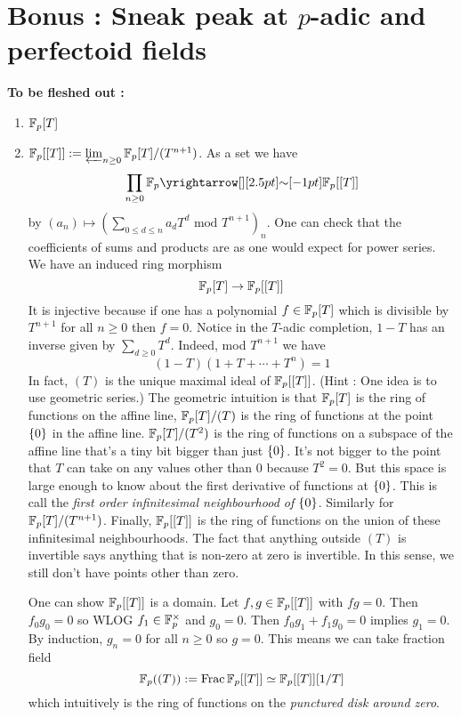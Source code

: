 \documentclass{article}
\begin{document}
\section{Bonus : Sneak peak at $p$-adic and perfectoid fields}

\textbf{To be fleshed out : }
\begin{enumerate}
  \item $\mathbb{F}_p[T]$
  \item $\mathbb{F}_p[[T]] := \varprojlim_{n \geq 0} \mathbb{F}_p[T] / (T^{n+1})$.
  As a set we have \[
    \prod_{n \geq 0} \bF_p \map{\sim}{} \bF_p[[T]]
  \]
  by $(a_n) \mapsto (\sum_{0 \leq d \leq n} a_d T^d \text{ mod } T^{n+1})_n$.
  One can check that the coefficients of
  sums and products are as one would expect for power series.
  We have an induced ring morphism \[
    \mathbb{F}_p[T] \to \mathbb{F}_p[[T]]
  \]
  It is injective because if one has a polynomial $f \in \mathbb{F}_p[T]$
  which is divisible by $T^{n+1}$ for all $n \geq 0$ then $f = 0$.
  Notice in the $T$-adic completion,
  $1 - T$ has an inverse given by $\sum_{d \geq 0} T^d$.
  Indeed, mod $T^{n+1}$ we have \[
    (1 - T)(1 + T + \cdots + T^{n}) = 1
  \]
  In fact, $(T)$ is the unique maximal ideal of $\mathbb{F}_p[[T]]$.
  (Hint : One idea is to use geometric series.)
  The geometric intuition is that 
  $\mathbb{F}_p[T]$ is the ring of functions on the affine line,
  $\mathbb{F}_p[T] / (T)$ is the ring of functions 
  at the point $\left\{0\right\}$ in the affine line.
  $\mathbb{F}_p[T] / (T^2)$ is the ring of functions on 
  a subspace of the affine line that's a tiny bit bigger than just $\left\{0\right\}$.
  It's not bigger to the point that $T$ can take on any values
  other than $0$ because $T^2 = 0$.
  But this space is large enough to know about
  the first derivative of functions at $\left\{0\right\}$.
  This is call the \emph{first order infinitesimal neighbourhood of $\left\{0\right\}$}.
  Similarly for $\mathbb{F}_p[T] / (T^{n+1})$.
  Finally, $\mathbb{F}_p[[T]]$ is the ring of functions
  on the union of these infinitesimal neighbourhoods.
  The fact that anything outside $(T)$ is invertible
  says anything that is non-zero at zero is invertible.
  In this sense, we still don't have points other than zero.

  One can show $\mathbb{F}_p[[T]]$ is a domain.
  Let $f , g \in \mathbb{F}_p[[T]]$ with $f g = 0$.
  Then $f_0 g_0 = 0$ so WLOG $f_1 \in \mathbb{F}_p^\times$ and $g_0 = 0$.
  Then $f_0 g_1 + f_1 g_0 = 0$ implies $g_1 = 0$.
  By induction, $g_n = 0$ for all $n \geq 0$
  so $g = 0$.
  This means we can take fraction field \[
    \mathbb{F}_p((T)) := \mathrm{Frac}\,\mathbb{F}_p[[T]] \simeq \mathbb{F}_p[[T]][1 / T]
  \]
  which intuitively is the ring of functions on the
  \emph{punctured disk around zero}.


\end{enumerate}
\end{document}

